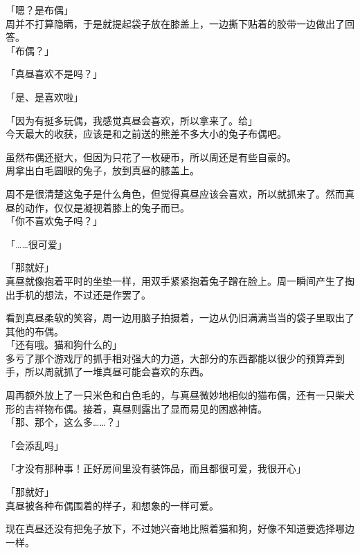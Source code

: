 「嗯？是布偶」\\

周并不打算隐瞒，于是就提起袋子放在膝盖上，一边撕下贴着的胶带一边做出了回答。\\

「布偶？」

「真昼喜欢不是吗？」

「是、是喜欢啦」

「因为有挺多玩偶，我感觉真昼会喜欢，所以拿来了。给」\\

今天最大的收获，应该是和之前送的熊差不多大小的兔子布偶吧。

虽然布偶还挺大，但因为只花了一枚硬币，所以周还是有些自豪的。\\

周拿出白毛圆眼的兔子，放到真昼的膝盖上。

周不是很清楚这兔子是什么角色，但觉得真昼应该会喜欢，所以就抓来了。然而真昼的动作，仅仅是凝视着膝上的兔子而已。\\

「你不喜欢兔子吗？」

「……很可爱」

「那就好」\\

真昼就像抱着平时的坐垫一样，用双手紧紧抱着兔子蹭在脸上。周一瞬间产生了掏出手机的想法，不过还是作罢了。

看到真昼柔软的笑容，周一边用脑子拍摄着，一边从仍旧满满当当的袋子里取出了其他的布偶。\\

「还有哦。猫和狗什么的」\\

多亏了那个游戏厅的抓手相对强大的力道，大部分的东西都能以很少的预算弄到手，所以周就抓了一堆真昼可能会喜欢的东西。

周再额外放上了一只米色和白色毛的，与真昼微妙地相似的猫布偶，还有一只柴犬形的吉祥物布偶。接着，真昼则露出了显而易见的困惑神情。\\

「那、那个，这么多……？」

「会添乱吗」

「才没有那种事！正好房间里没有装饰品，而且都很可爱，我很开心」

「那就好」\\

真昼被各种布偶围着的样子，和想象的一样可爱。

现在真昼还没有把兔子放下，不过她兴奋地比照着猫和狗，好像不知道要选择哪边一样。\\

